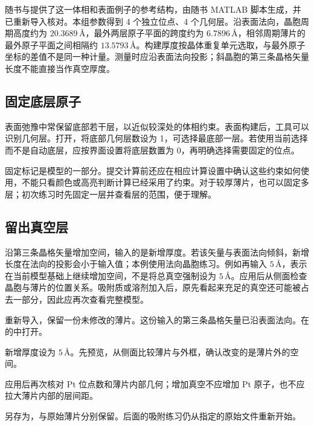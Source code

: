 随书与提供了这一体相和表面例子的参考结构，由随书 MATLAB\regmark{} 脚本生成，并已重新导入核对。本组参数得到 4 个独立位点、4 个几何层。沿表面法向，晶胞周期高度约为 $20.3689\,\text{\AA}$，最外两层原子平面的跨度约为 $6.7896\,\text{\AA}$，相邻周期薄片的最外原子平面之间相隔约 $13.5793\,\text{\AA}$。构建厚度按晶体重复单元选取，与最外原子坐标的差值不是同一种计量。测量时应沿表面法向投影；斜晶胞的第三条晶格矢量长度不能直接当作真空厚度。

\subsection{固定底层原子}

表面弛豫中常保留底部若干层，以近似较深处的体相约束。表面构建后，工具可以识别几何层。打开，将底部几何层数设为 1，可选择最底部一层。若使用当前选择而不是自动底层，应按界面设置将底层数置为 0，再明确选择需要固定的位点。

固定标记是模型的一部分。提交计算前还应在相应计算设置中确认这些约束如何使用，不能只看颜色或高亮判断计算已经采用了约束。对于较厚薄片，也可以固定多层；初次练习时先固定一层并查看层的范围，便于理解。

\subsection{留出真空层}

沿第三条晶格矢量增加空间，输入的是新增厚度。若该矢量与表面法向倾斜，新增长度在法向的投影会小于输入值；本例使用法向晶胞练习。例如再输入 $5\,\text{\AA}$，表示在当前模型基础上继续增加空间，不是将总真空强制设为 $5\,\text{\AA}$。应用后从侧面检查晶胞与薄片的位置关系。吸附质或溶剂加入后，原先看起来充足的真空还可能被占去一部分，因此应再次查看完整模型。



\begin{steps}
  \item 重新导入，保留一份未修改的薄片。这份输入的第三条晶格矢量已沿表面法向。在的中打开。
  \item 新增厚度设为 $5\,\text{\AA}$。先预览，从侧面比较薄片与外框，确认改变的是薄片外的空间。
  \item 应用后再次核对 Pt 位点数和薄片内部几何；增加真空不应增加 Pt 原子，也不应拉大薄片内部的层间距。
  \item 另存为，与原始薄片分别保留。后面的吸附练习仍从指定的原始文件重新开始。
\end{steps}

